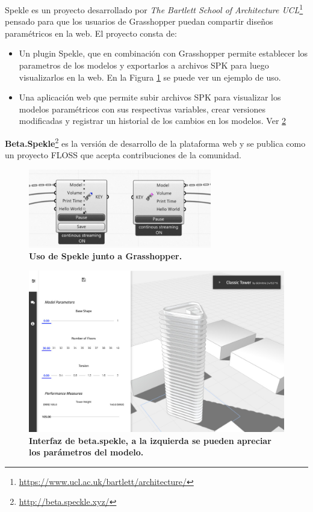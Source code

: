 Spekle\citep{UCL2018} es un proyecto desarrollado por \textit{The Bartlett School of Architecture UCL}\footnote{\url{https://www.ucl.ac.uk/bartlett/architecture/}} pensado para que los usuarios de Grasshopper puedan compartir diseños paramétricos en la web. 
El proyecto consta de:
\begin{itemize}
    \item Un plugin Spekle, que en combinación con Grasshopper permite establecer los parametros de los modelos y exportarlos a archivos SPK para luego visualizarlos en la web. En la Figura \ref{fig:plugin} se puede ver un ejemplo de uso.
    \item Una aplicación web que permite subir archivos SPK para visualizar los modelos paramétricos con sus respectivas variables, crear versiones modificadas y registrar un historial de los cambios en los modelos. Ver \ref{fig:spekle}
\end{itemize}

\textbf{Beta.Spekle}\footnote{\url{http://beta.speckle.xyz/}} es la versión de desarrollo de la plataforma web y se publica como un proyecto FLOSS que acepta contribuciones de la comunidad.

\begin{figure}[h]
\includegraphics[width=8cm]{Img/WEB/web-plugin.jpg}
\centering
\caption{\textbf{ \footnotesize{Uso de Spekle junto a Grasshopper.}}}
\label{fig:plugin}
\end{figure}

\begin{figure}[h]
\includegraphics[width=14cm]{Img/WEB/web-spekle.jpg}
\centering
\caption{\textbf{ \footnotesize{Interfaz de beta.spekle, a la izquierda se pueden apreciar los parámetros del modelo.}}}
\label{fig:spekle}
\end{figure}


